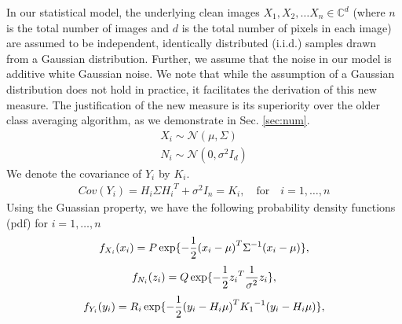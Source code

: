 \documentclass{article}
\begin{document}
In our statistical model, the underlying clean images $X_1, X_2, \ldots X_n \in \mathbb{C}^{d}$ (where $n$ is the total number of images and $d$ is the total number of pixels in each image) are assumed to be independent, identically distributed (i.i.d.) samples drawn from a Gaussian distribution. Further, we assume that the noise in our model is additive white Gaussian noise. We note that while the assumption of a Gaussian distribution does not hold in practice, it facilitates the derivation of this new measure. The justification of the new measure is its superiority over the older class averaging algorithm, as we demonstrate in Sec. \ref{sec:num}.
\begin{eqnarray} 
X_i  \sim \mathcal{N}( {\mu},\Sigma) \nonumber \\ 
N_i  \sim \mathcal{N}(0,{\sigma}^2 I_d )
\end{eqnarray}
We denote the covariance of $Y_i$ by $K_i$.
\begin{eqnarray}
Cov(Y_i) = H_i \Sigma {H_i}^T + {\sigma}^2 I_n = K_i,\quad \text{for} \quad i=1,\ldots,n 
\end{eqnarray}
Using the Guassian property, we have the following probability density functions (pdf) for $i=1,\ldots,n$
\begin{equation}
\small{
f_{X_i}(x_i) = P \exp\{-\frac{1}{2}{(x_i-\mu)}^T {\Sigma}^{-1}(x_i-\mu)\},}
\end{equation}
\begin{equation}
\small{f_{N_i}(z_i) = Q \exp\{-\frac{1}{2}{z_i}^T \frac{1}{\sigma^2}z_i\},}
\end{equation}
\begin{equation}
\small{f_{Y_i}(y_i) = R_i \exp\{-\frac{1}{2}{(y_i-H_i\mu)}^T {K_1}^{-1}(y_i-H_i\mu)\}, }
\end{equation}
\end{document}
